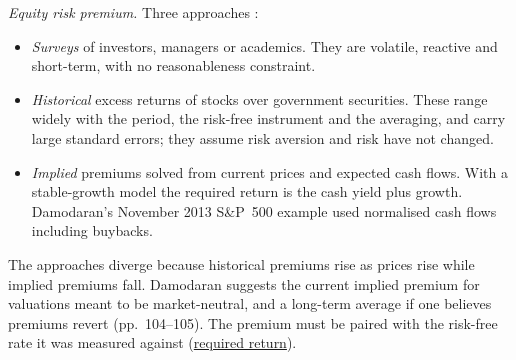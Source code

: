 \begin{qfmethod}
\emph{Equity risk premium.} Three approaches \citep[pp.~94--105]{applied-corporate-finance-2014}:
\begin{itemize}
\item \emph{Surveys} of investors, managers or academics. They are volatile, reactive and short-term, with no reasonableness constraint.
\item \emph{Historical} excess returns of stocks over government securities. These range widely with the period, the risk-free instrument and the averaging, and carry large standard errors; they assume risk aversion and risk have not changed.
\item \emph{Implied} premiums solved from current prices and expected cash flows. With a stable-growth model the required return is the cash yield plus growth. Damodaran's November 2013 S\&P~500 example used normalised cash flows including buybacks.
\end{itemize}
The approaches diverge because historical premiums rise as prices rise while implied premiums fall. Damodaran suggests the current implied premium for valuations meant to be market-neutral, and a long-term average if one believes premiums revert (pp.~104--105). The premium must be paired with the risk-free rate it was measured against (\hyperref[meth:required-return-on-equity]{required return}).


\end{qfmethod}
